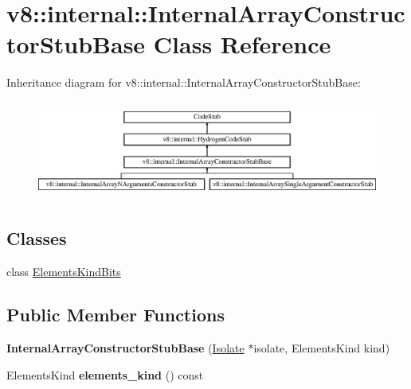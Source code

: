 \hypertarget{classv8_1_1internal_1_1_internal_array_constructor_stub_base}{}\section{v8\+:\+:internal\+:\+:Internal\+Array\+Constructor\+Stub\+Base Class Reference}
\label{classv8_1_1internal_1_1_internal_array_constructor_stub_base}
Inheritance diagram for v8\+:\+:internal\+:\+:Internal\+Array\+Constructor\+Stub\+Base\+:\begin{figure}[H]
\begin{center}
\leavevmode
\includegraphics[height=3.265306cm]{classv8_1_1internal_1_1_internal_array_constructor_stub_base}
\end{center}
\end{figure}
\subsection*{Classes}
\begin{DoxyCompactItemize}
\item 
class \hyperlink{classv8_1_1internal_1_1_internal_array_constructor_stub_base_1_1_elements_kind_bits}{Elements\+Kind\+Bits}
\end{DoxyCompactItemize}
\subsection*{Public Member Functions}
\begin{DoxyCompactItemize}
\item 
{\bfseries Internal\+Array\+Constructor\+Stub\+Base} (\hyperlink{classv8_1_1internal_1_1_isolate}{Isolate} $\ast$isolate, Elements\+Kind kind)\hypertarget{classv8_1_1internal_1_1_internal_array_constructor_stub_base_a605f66a15ede898fefd5fe310c4c2860}{}\label{classv8_1_1internal_1_1_internal_array_constructor_stub_base_a605f66a15ede898fefd5fe310c4c2860}

\item 
Elements\+Kind {\bfseries elements\+\_\+kind} () const \hypertarget{classv8_1_1internal_1_1_internal_array_constructor_stub_base_ad1224e3313ec9f9179913ac544aee07a}{}\label{classv8_1_1internal_1_1_internal_array_constructor_stub_base_ad1224e3313ec9f9179913ac544aee07a}

\end{DoxyCompactItemize}

